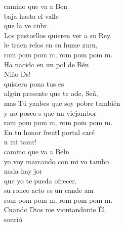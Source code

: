 \documentclass[12pt]{article}
\begin{document}
\begin{multicols*}{2}
\begin{cancion}[El tamborilero][]%
	 camino que va a Ben \\
baja hasta el valle \\
	que la ve cubr. \\
	Los pastorllos quieren ver a su Rey,\\
	le traen relos en su hume zurn,\\
	rom pom pom m, rom pom pom m.\\
	Ha nacido en un pol de Bén\\
	 Niño Ds!\\
	 quisiera pona tus es\\
	algún presente que te ade, Señ, \\
	mas Tú yaabes que soy pobre también\\
	y no poseo s que un viejambor\\
	rom pom pom m, rom pom pom m.\\
	En tu honor frentl portal caré\\
	n mi tamr!\\
	 camino que va a Beln\\
	yo voy marcando con mi vo tambo\\
	nada hay jor \\
que yo te pueda ofrecer,\\
	su ronco acto es un cande am\\
	rom pom pom m, rom pom pom m.\\
	Cuando Dios me viontandonte Él,\\
	 sonrió\\
\end{cancion}%


\end{multicols*}
\end{document}
